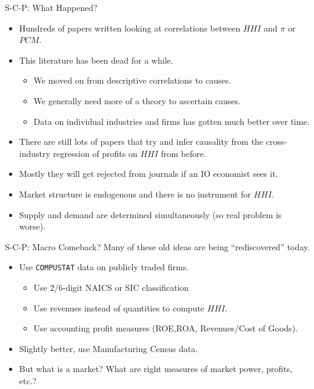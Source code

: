\documentclass[aspectratio=169,11pt]{beamer}
\begin{document}
\begin{frame}{S-C-P: What Happened?}
\begin{itemize}
\item Hundreds of papers written looking at correlations between $HHI$ and $\pi$ or $PCM$.
\item This literature has been dead for a while.
\begin{itemize}
\item We moved on from descriptive correlations to causes.
\item We generally need more of a theory to ascertain causes.
\item Data on individual industries and firms has gotten much better over time.
\end{itemize}
\item There are still lots of papers that try and infer causality from the cross-industry regression of profits on $HHI$ from before.
\item Mostly they will get rejected from journals if an IO economist sees it.
\item Market structure is \alert{endogenous} and there is no instrument for $HHI$.
\item Supply and demand are determined \alert{simultaneously} (so real problem is worse).
\end{itemize}
\end{frame}


\begin{frame}{S-C-P: Macro Comeback?}
Many of these old ideas are being ``rediscovered'' today.
\begin{itemize}
\item Use \texttt{COMPUSTAT} data on publicly traded firms.
\begin{itemize}
\item Use 2/6-digit NAICS or SIC classification
\item Use revenues instead of quantities to compute $HHI$.
\item Use accounting profit measures (ROE,ROA, Revenues/Cost of Goods).
\end{itemize}
\item Slightly better, use Manufacturing Census data.
\item But what is a market? What are right measures of market power, profits, etc.?
\end{itemize}
\end{frame}
\end{document}
